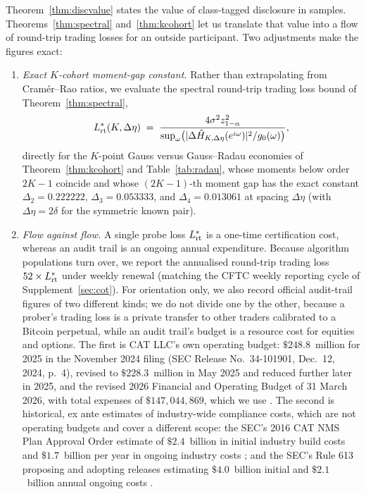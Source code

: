 \documentclass[12pt]{article}
\theoremstyle{definition}
\theoremstyle{remark}
\begin{document}
Theorem~\ref{thm:discvalue} states the value of class-tagged disclosure in samples. Theorems~\ref{thm:spectral} and~\ref{thm:kcohort} let us translate that value into a flow of round-trip trading losses for an outside participant. Two adjustments make the figures exact:
\begin{enumerate}[label=(\roman*),itemsep=1pt]
\item \emph{Exact $K$-cohort moment-gap constant.} Rather than extrapolating from Cram\'er--Rao ratios, we evaluate the spectral round-trip trading loss bound of Theorem~\ref{thm:spectral},
\[
L_{\rm rt}^*(K,\Delta\eta)\;=\;\frac{4\sigma^2 z_{1-\alpha}^2}{\sup_\omega\bigl(|\Delta\hat H_{K,\Delta\eta}(e^{i\omega})|^2/g_0(\omega)\bigr)},
\]
directly for the $K$-point Gauss versus Gauss--Radau economies of Theorem~\ref{thm:kcohort} and Table~\ref{tab:radau}, whose moments below order $2K-1$ coincide and whose $(2K-1)$-th moment gap has the exact constant $\Delta_2=0.222222$, $\Delta_3=0.053333$, and $\Delta_4=0.013061$ at spacing $\Delta\eta$ (with $\Delta\eta=2\delta$ for the symmetric known pair).
\item \emph{Flow against flow.} A single probe loss $L_{\rm rt}^*$ is a one-time certification cost, whereas an audit trail is an ongoing annual expenditure. Because algorithm populations turn over, we report the annualised round-trip trading loss $52\times L_{\rm rt}^*$ under weekly renewal (matching the CFTC weekly reporting cycle of Supplement~\ref{sec:cot}). For orientation only, we also record official audit-trail figures of two different kinds; we do not divide one by the other, because a prober's trading loss is a private transfer to other traders calibrated to a Bitcoin perpetual, while an audit trail's budget is a resource cost for equities and options. The first is CAT LLC's own operating budget: $\$248.8$~million for 2025 in the November 2024 filing (SEC Release No.\ 34-101901, Dec.\ 12, 2024, p.~4), revised to $\$228.3$~million in May 2025 and reduced further later in 2025, and the revised 2026 Financial and Operating Budget of 31 March 2026, with total expenses of $\$147{,}044{,}869$, which we use \citep{catbudget2026}. The second is historical, ex ante estimates of industry-wide compliance costs, which are not operating budgets and cover a different scope: the SEC's 2016 CAT NMS Plan Approval Order estimate of $\$2.4$~billion in initial industry build costs and $\$1.7$~billion per year in ongoing industry costs \citep[Release No.\ 34-79318, Nov.\ 15, 2016, 81 FR 84696 at 84801, p.~363]{sec2016}; and the SEC's Rule 613 proposing and adopting releases estimating $\$4.0$~billion initial and $\$2.1$~billion annual ongoing costs \citep[Release No.\ 34-62174, May 26, 2010, 75 FR 32556 at 32598, 32600, pp.~147, 153; Release No.\ 34-67457, July 18, 2012, 77 FR 45722 at 45790--45795, pp.~220--238]{sec2012}.
\end{enumerate}
\end{document}
